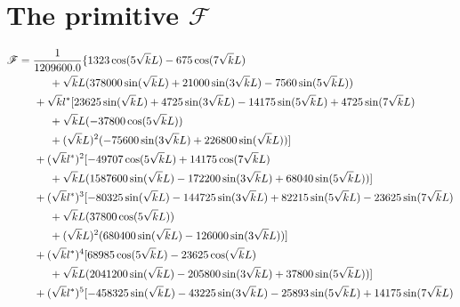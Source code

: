 \chapter{The primitive \texorpdfstring{$\mathscr{F}$}{F}}\label{c:primitiveF}

{\scriptsize
 \begin{align*}
  \mathscr{F}&=\frac{1}{1209600.0} \{1323 \cos(5\sqrt{k}L)-675 \cos(7\sqrt{k}L)\\
        &\hspace{1cm}+\sqrt{k}L (378000 \sin(\sqrt{k}L)+21000 \sin(3\sqrt{k}L)-7560 \sin(5\sqrt{k}L))\\
        &\hspace{0.5cm}+\sqrt{k}l^* [23625 \sin(\sqrt{k}L)+4725 \sin(3\sqrt{k}L)-14175 \sin(5\sqrt{k}L)+4725 \sin(7\sqrt{k}L)\\
        &\hspace{1cm}+\sqrt{k}L  (-37800 \cos(5\sqrt{k}L))\\
        &\hspace{1cm}+(\sqrt{k}L)^2 (-75600 \sin(3\sqrt{k}L)+226800 \sin(\sqrt{k}L))]\\
        &\hspace{0.5cm}+(\sqrt{k}l^*)^2 [-49707 \cos(5\sqrt{k}L)+14175 \cos(7\sqrt{k}L)\\
        &\hspace{1cm}+\sqrt{k}L  (1587600 \sin(\sqrt{k}L)-172200 \sin(3\sqrt{k}L)+68040 \sin(5\sqrt{k}L))]\\
        &\hspace{0.5cm}+(\sqrt{k}l^*)^3 [-80325 \sin(\sqrt{k}L)-144725 \sin(3\sqrt{k}L)+82215 \sin(5\sqrt{k}L)-23625 \sin(7\sqrt{k}L)\\
        &\hspace{1cm}+\sqrt{k}L  (37800 \cos(5\sqrt{k}L))\\
        &\hspace{1cm}+(\sqrt{k}L)^2 (680400 \sin(\sqrt{k}L)-126000 \sin(3\sqrt{k}L))]\\
        &\hspace{0.5cm}+(\sqrt{k}l^*)^4 [68985 \cos(5\sqrt{k}L)-23625 \cos(\sqrt{k}L)\\
        &\hspace{1cm}+\sqrt{k}L  (2041200 \sin(\sqrt{k}L)-205800 \sin(3\sqrt{k}L)+37800 \sin(5\sqrt{k}L))]\\
        &\hspace{0.5cm}+(\sqrt{k}l^*)^5 [-458325 \sin(\sqrt{k}L)-43225 \sin(3\sqrt{k}L)-25893 \sin(5\sqrt{k}L)+14175 \sin(7\sqrt{k}L)\\

\end{align*}}
